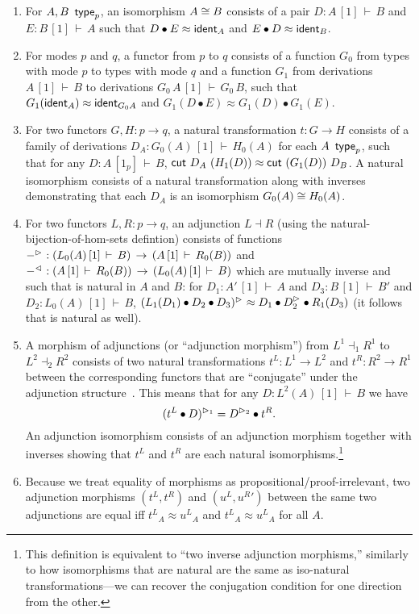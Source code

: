 \documentclass{drl-common/llncs}
\newcommand{\la}{\ensuremath{\dashv}}
\renewcommand\wftp[2]{\ensuremath{#1 \,\,\, \dsd{type}_{#2}}}
\newcommand\seq[3]{\ensuremath{#1 \, [ #2 ] \, \vdash \, #3}}
\newcommand\ident[1]{\ensuremath{\dsd{ident}_{#1}}}
\newcommand\cutsym{\ensuremath{\dsd{cut}}}
\newcommand\cut[2]{\ensuremath{{\cutsym \,\, #1 \,\, #2}}}
\newcommand\cuti{\ensuremath{\bullet}}
\newcommand\ap[2]{\ensuremath{#1 \approx #2}}
\begin{document}
\begin{enumerate}
\item For $\wftp{A,B}{p}$, an isomorphism $A \cong B$ consists of a pair $D :
\seq{A}{1}{B}$ and $E : \seq{B}{1}{A}$ such that
$\ap{{D} \cuti {E}}{\ident{A}}$ and $\ap{{E} \cuti {D}}{\ident{B}}$.

\item For modes $p$ and $q$, a functor from $p$ to $q$ consists of 
a function $G_0$ from types with mode $p$ to types with mode $q$ 
and a function $G_1$ from derivations \seq{A}{1}{B} to 
derivations \seq{G_0 \, A}{1}{G_0 \, B}, such that
$\ap {G_1(\ident{A})}  {\ident{G_0 A}}$
and
$\ap {G_1(D \cuti E)}  {G_1(D) \cuti G_1(E)}$.

\item For two functors $G,H : p \to q$, a natural transformation $t : G
  \to H$ consists of a family of derivations $D_A :
  \seq{G_0(A)}{1}{H_0(A)}$ for each \wftp{A}{p}, such that for any $D :
  \seq{A}{1_p}{B}$, \ap{\cut{D_A}{(H_1(D))}}{\cut{(G_1(D))}{D_B}}.  A
  natural isomorphism consists of a natural transformation along with
  inverses demonstrating that each $D_A$ is an isomorphism $G_0(A) \cong
  H_0(A)$.  

\item For two functors $L,R : p \to q$, an adjunction $L \la R$ (using
  the natural-bijection-of-hom-sets defintion) consists of functions
  $\ltor{-}{} : (\seq{L_0(A)}{1}{B}) \, \to \, (\seq{A}{1}{R_0(B)})$ and
  $\rtol{-}{} : (\seq{A}{1}{R_0(B)}) \, \to \, (\seq{L_0(A)}{1}{B})$ which are
  mutually inverse and such that \ltor{-}{} is natural in $A$ and $B$: for
  $D_1 : \seq{A'}{1}{A}$ and $D_3 : \seq{B}{1}{B'}$ and $D_2 :
  \seq{L_0(A)}{1}{B}$, \ap{\ltor{(L_1(D_1) \cuti D_2 \cuti D_3)}{}}{D_1
    \cuti \ltor{D_2}{} \cuti {R_1(D_3)}} (it follows that \rtol{-}{} is
  natural as well).  

\item A morphism of adjunctions (or ``adjunction morphism'') from $L^1
  \la_1 R^1$ to $L^2 \la_2 R^2$ consists of two natural transformations
  $t^L : L^1 \to L^2$ and $t^R : R^2 \to R^1$ between the corresponding
  functors that are ``conjugate'' under the adjunction
  structure~\citep[\S IV.7]{maclane98working}.
  This means that for any $D : \seq{L^2(A)}{1}{B}$ we have
  \[
  \ltor{(t^L \cuti D)}{1} = \ltor{D}{2} \cuti t^R.
  \]
  An adjunction isomorphism consists of an adjunction morphism together
  with inverses showing that $t^L$ and $t^R$ are each natural
  isomorphisms.\footnote{This definition is equivalent to ``two inverse
    adjunction morphisms,'' similarly to how isomorphisms that are
    natural are the same as iso-natural transformations---we can recover
    the conjugation condition for one direction from the other.}

\item Because we treat equality of morphisms as
  propositional/proof-irrelevant, two adjunction morphisms $(t^L,t^R)$
  and $({u^L},{u^R}')$ between the same two adjunctions are equal iff
  $\ap{{t^L}_A}{{u^L}_A}$ and $\ap{{t^L}_A}{{u^L}_A}$
  for all $A$.
\end{enumerate}
\end{document}
